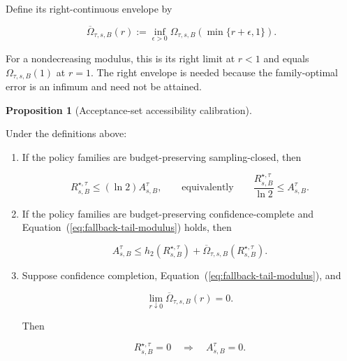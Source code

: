 \documentclass[10pt]{article} %
\renewcommand{\eqref}[1]{\textup{(\ref{#1})}}
\providecommand{\1}{\mathbf{1}}  %
\theoremstyle{remark}
\theoremstyle{definition}
\newtheorem{proposition}{Proposition}[section]
\begin{document}
Define its right-continuous envelope by

\begin{equation}
\overline\Omega_{\tau,s,B}(r)
:=
\inf_{\epsilon>0}
\Omega_{\tau,s,B}\!\left(
\min\{r+\epsilon,1\}
\right).
\label{eq:right-continuous-tail-envelope}
\end{equation}

For a nondecreasing modulus, this is its right limit at $r<1$ and equals $\Omega_{\tau,s,B}(1)$ at $r=1$. The right envelope is needed because the family-optimal error is an infimum and need not be attained.

\begin{proposition}[Acceptance-set accessibility calibration]
\label{prop:tolerance-accessibility-calibration}

Under the definitions above:

\begin{enumerate}[label=(\roman*),itemsep=3pt,topsep=3pt]

\item If the policy families are budget-preserving sampling-closed, then

\begin{equation}
R_{s,B}^{\star,\tau}
\leq
(\ln 2)A_{s,B}^{\tau},
\qquad\text{equivalently}\qquad
\frac{R_{s,B}^{\star,\tau}}{\ln 2}
\leq
A_{s,B}^{\tau}.
\label{eq:sampling-accessibility-bound}
\end{equation}

\item If the policy families are budget-preserving confidence-complete and Equation~\eqref{eq:fallback-tail-modulus} holds, then

\begin{equation}
A_{s,B}^{\tau}
\leq
h_2\!\left(R_{s,B}^{\star,\tau}\right)
+
\overline\Omega_{\tau,s,B}\!\left(
R_{s,B}^{\star,\tau}
\right).
\label{eq:completion-accessibility-bound}
\end{equation}

\item Suppose confidence completion, Equation~\eqref{eq:fallback-tail-modulus}, and

\begin{equation}
\lim_{r\downarrow0}
\overline\Omega_{\tau,s,B}(r)
=
0.
\label{eq:vanishing-fallback-tail}
\end{equation}

Then

\begin{equation}
R_{s,B}^{\star,\tau}=0
\quad\Longrightarrow\quad
A_{s,B}^{\tau}=0.
\end{equation}


\end{enumerate}
\end{proposition}
\end{document}
